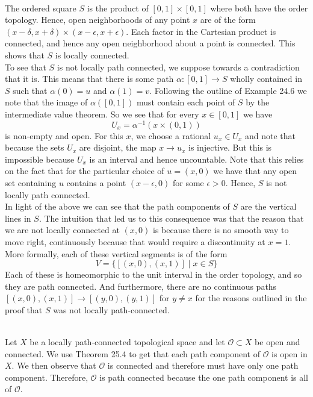 \documentclass{article}
\DeclareMathOperator{\suchthat}{\mathrel{|}}
\newcommand{\problem}[1]{\noindent{\textbf{Problem #1}}\\}
\begin{document}
\problem{3.25.3} The ordered square $S$ is the product of $[0,1] \times [0,1]$ where both have the order topology. Hence, open neighborhoods of any point $x$ are of the form $(x - \delta, x + \delta) \times (x - \epsilon, x+ \epsilon)$. Each factor in the Cartesian product is connected, and hence any open neighborhood about a point is connected. This shows that $S$ is locally connected. \\
	To see that $S$ is not locally path connected, we suppose towards a contradiction that it is. This means that there is some path $\alpha: [0,1] \to S$ wholly contained in $S$ such that $\alpha(0) = u$ and $\alpha(1) = v$. Following the outline of Example 24.6 we note that the image of $\alpha([0,1])$ must contain each point of $S$ by the intermediate value theorem. So we see that for every $x \in [0,1]$ we have 
\[
U_x = \alpha^{-1}(x \times (0,1))
\]
is non-empty and open. For this $x$, we choose a rational $u_x \in U_x$ and note that because the sets $U_x$ are disjoint, the map $x \to u_x$ is injective. But this is impossible because $U_x$ is an interval and hence uncountable. Note that this relies on the fact that for the particular choice of $u = (x,0)$ we have that any open set containing $u$ contains a point $(x - \epsilon, 0)$ for some $\epsilon > 0$. Hence, $S$ is not locally path connected. \\
In light of the above we can see that the path components of $S$ are the vertical lines in $S$. The intuition that led us to this consequence was that the reason that we are not locally connected at $(x,0)$ is because there is no smooth way to move right, continuously because that would require a discontinuity at $x = 1$. More formally, each of these vertical segments is of the form
\[
V = \{[(x,0), (x,1)] \suchthat x \in S\}
\]
Each of these is homeomorphic to the unit interval in the order topology, and so they are path connected. And furthermore, there are no continuous paths $[(x,0),(x,1)] \to [(y,0),(y,1)]$ for $y\neq x$ for the reasons outlined in the proof that $S$ was not locally path-connected. 

\problem{3.25.4} Let $X$ be a locally path-connected topological space and let $\mathcal{O} \subset X$ be open and connected.  We use Theorem 25.4 to get that each path component of $\mathcal{O}$ is open in $X$. We then observe that $\mathcal{O}$ is connected and therefore must have only one path component. Therefore, $\mathcal{O}$ is path connected because the one path component is all of $\mathcal{O}$.
\end{document}
